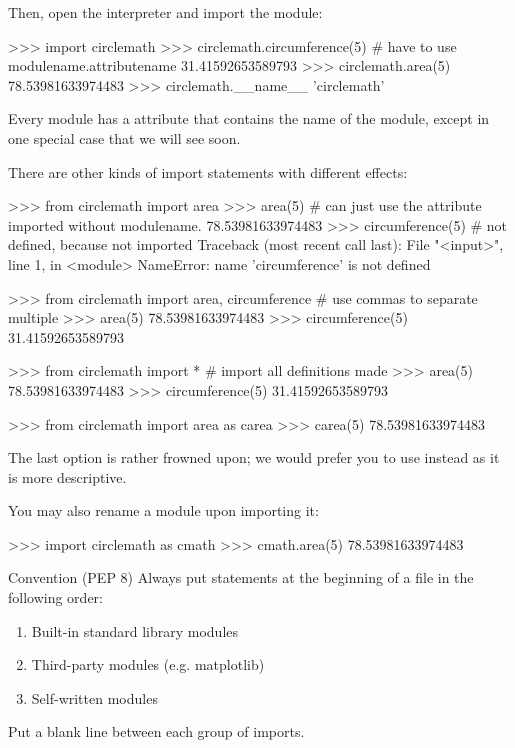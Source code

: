 \documentclass[11pt]{cselabheader}
\begin{document}
Then, open the interpreter and import the module:

\begin{pyconcode}
>>> import circlemath
>>> circlemath.circumference(5) # have to use modulename.attributename
31.41592653589793
>>> circlemath.area(5)
78.53981633974483
>>> circlemath.__name__
'circlemath'
\end{pyconcode}

Every module has a  attribute that contains the name of
the module, except in one special case that we will see soon.

There are other kinds of import statements with different effects:

\begin{pyconcode}
>>> from circlemath import area
>>> area(5) # can just use the attribute imported without modulename.
78.53981633974483
>>> circumference(5) # not defined, because not imported
Traceback (most recent call last):
  File "<input>", line 1, in <module>
NameError: name 'circumference' is not defined
\end{pyconcode}

\begin{pyconcode}
>>> from circlemath import area, circumference # use commas to separate multiple
>>> area(5)
78.53981633974483
>>> circumference(5)
31.41592653589793
\end{pyconcode}

\begin{pyconcode}
>>> from circlemath import * # import all definitions made
>>> area(5)
78.53981633974483
>>> circumference(5)
31.41592653589793
\end{pyconcode}

\begin{pyconcode}
>>> from circlemath import area as carea
>>> carea(5)
78.53981633974483
\end{pyconcode}

The last option is rather frowned upon; we would prefer you to use
 instead as it is more descriptive.

You may also rename a module upon importing it:

\begin{pyconcode}
>>> import circlemath as cmath
>>> cmath.area(5)
78.53981633974483
\end{pyconcode}


\begin{infobox}{Convention (PEP 8)}
  Always put  statements at the beginning of a file in the
  following order:
  \begin{enumerate}
    \item Built-in standard library modules
    \item Third-party modules (e.g. matplotlib)
    \item Self-written modules
  \end{enumerate}
  Put a blank line between each group of imports.
\end{infobox}
\end{document}
